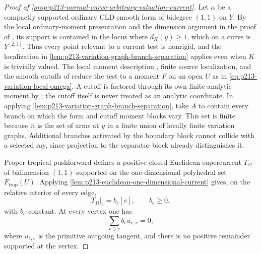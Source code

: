 \begin{proof}[Proof of
\cref{prop:p213-normal-curve-arbitrary-valuation-current}]
Let $\alpha$ be a compactly supported ordinary CLD-smooth form of
bidegree $(1,1)$ on $Y$.  By the local ordinary-moment presentation
\cite[Proposition~15.1.1(b)]{CLD25} and the dimension argument in the
proof of \cite[Proposition~15.2.1(a)]{CLD25}, its support is contained in
the locus where $d_K(y)\geq1$, which on a curve is $Y^{[2,3]}$.  Thus every
point relevant to a current test is nonrigid, and
the localization in
\cref{lem:p213-variation-graph-branch-separation} applies even when $K$
is trivially valued.  The local moment description
\cite[Proposition~15.1.1(b)]{CLD25}, finite source localization, and the
smooth cutoffs of \cite[Corollary~15.2.9]{CLD25} reduce the test to a
moment $F$ on an open $U$ as in
\eqref{eq:p213-variation-local-omega}.  A cutoff is factored through its
own finite analytic moment by \cite[Corollary~15.1.2]{CLD25}; the cutoff
itself is never treated as an analytic coordinate.  In applying
\cref{lem:p213-variation-graph-branch-separation}, take $A$ to contain
every branch on which the form and cutoff moment blocks vary.  This set is
finite because it is the set of arms at $y$ in a finite union of locally
finite variation graphs.  Additional branches activated by the boundary
block cannot collide with a selected ray, since projection to the
separator block already distinguishes it.

Proper tropical pushforward defines a positive closed Euclidean
supercurrent $T_\Omega$ of bidimension $(1,1)$ supported on the
one-dimensional polyhedral set $F_{\mathrm{trop}}(U)$.  Applying
\cref{lem:p213-euclidean-one-dimensional-current} gives, on the relative
interior of every edge,
\begin{equation}
                         T_\Omega|_e=b_e[e],
             \qquad b_e\geq0,
 \label{eq:p213-variation-edge-density}
\end{equation}
with $b_e$ constant.  At every vertex one has
\begin{equation}
                         \sum_{e\ni v}b_eu_{e,v}=0,
 \label{eq:p213-variation-current-balance}
\end{equation}
where $u_{e,v}$ is the primitive outgoing tangent, and there is no
positive remainder supported at the vertex.


\end{proof}
